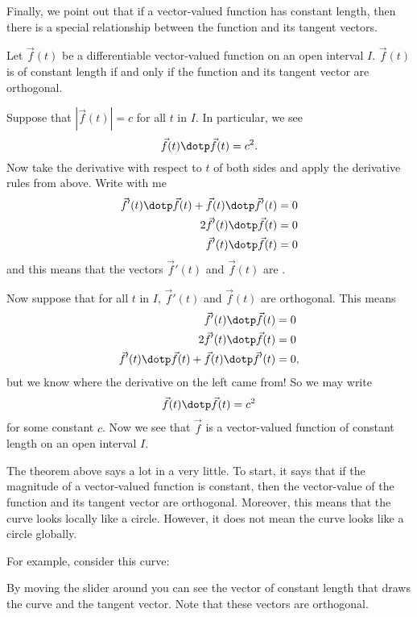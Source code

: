 \documentclass{ximera}
\begin{document}
Finally, we point out that if a vector-valued function has constant
length, then there is a special relationship between the function and
its tangent vectors.


\begin{theorem}
  Let $\vec f(t)$ be a differentiable vector-valued function on an
  open interval $I$. $\vec{f}(t)$ is of constant length if and only if
  the function and its tangent vector are orthogonal.
  \begin{explanation}
    Suppose that $|\vec f(t)| = c$ for all $t$ in $I$. In particular,
    we see
    \[
    \vec{f}(t) \dotp \vec{f}(t) = c^2.
    \]
    Now take the derivative with respect to $t$ of both sides and
    apply the derivative rules from above. Write with me
    \begin{align*}
      \vec{f}'(t) \dotp \vec{f}(t) + \vec{f}(t)\dotp \vec{f}'(t) &= 0\\
      2\vec{f}'(t) \dotp \vec{f}(t) &= 0\\
      \vec{f}'(t) \dotp \vec{f}(t) &= 0
    \end{align*}
    and this means that the vectors $\vec{f}'(t)$ and $\vec{f}(t)$ are
    .

    Now suppose that for all $t$ in $I$, $\vec{f}'(t)$ and
    $\vec{f}(t)$ are orthogonal. This means
    \begin{align*}
      \vec{f}'(t) \dotp \vec{f}(t) &= 0\\
      2\vec{f}'(t) \dotp \vec{f}(t) &= 0\\
      \vec{f}'(t) \dotp \vec{f}(t) + \vec{f}(t)\dotp \vec{f}'(t) &= 0,
    \end{align*}
    but we know where the derivative on the left came from! So we may
    write
    \[
    \vec{f}(t) \dotp \vec{f}(t) = c^2
    \]
    for some constant $c$. Now we see that $\vec{f}$ is a
    vector-valued function of constant length on an open interval
    $I$.
  \end{explanation}
\end{theorem}
The theorem above says a lot in a very little. To start, it says that
if the magnitude of a vector-valued function is constant, then the
vector-value of the function and its tangent vector are
orthogonal. Moreover, this means that the curve looks locally like a
circle. However, it does not mean the curve looks like a circle globally.
\begin{onlineOnly}
  For example, consider this curve:

  \begin{center}
  \end{center}

  By moving the slider around you can see the vector of constant
  length that draws the curve and the tangent vector. Note that these
  vectors are orthogonal.
\end{onlineOnly}
\end{document}
